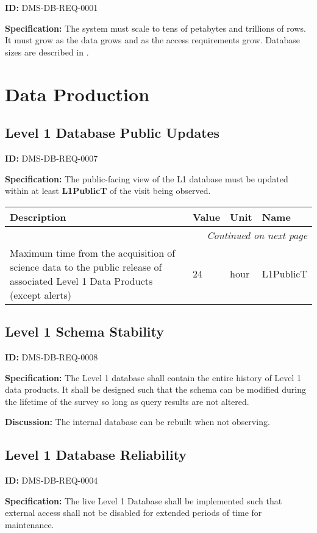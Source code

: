 \documentclass[SE,toc,lsstdraft]{lsstdoc}
\makeatletter
\newcommand{\paramname}[1]{\hspace{0pt}#1}
\newcommand{\unitname}[1]{\hspace{0pt}#1}
\newenvironment{parameters}[0]{%
\setlength\LTleft{0pt}
\setlength\LTright{\fill}
\begin{small}
\begin{longtable}[]{|p{0.49\textwidth}|l|p{0.6in}|p{1.70in}@{}|}

\hline \textbf{Description} & \textbf{Value} & \textbf{Unit} & \textbf{Name} \\ \hline
\endhead

\hline \multicolumn{4}{r}{\emph{Continued on next page}} \\
\endfoot

\hline\hline
\endlastfoot
}{%
\hline
\end{longtable}
\end{small}
}
\makeatother
\begin{document}
\label{DMS-DB-REQ-0001}
\textbf{ID:} DMS-DB-REQ-0001

\textbf{Specification:}
The system must scale to tens of petabytes and trillions of rows. It must grow as the data grows and as the access requirements grow. Database sizes are described in .

\section{Data Production}

\subsection{Level 1 Database Public Updates}

\label{DMS-DB-REQ-0007}
\textbf{ID:} DMS-DB-REQ-0007

\textbf{Specification:}
The public-facing view of the L1 database must be updated within at least \textbf{L1PublicT} of the visit being observed.

\begin{parameters}
Maximum time from the acquisition of science data to the public release of associated Level 1 Data Products (except alerts)
&
24
&
\unitname{%
hour
}
&
\paramname{%
L1PublicT
} \\\hline
\end{parameters}

\subsection{Level 1 Schema Stability}

\label{DMS-DB-REQ-0008}
\textbf{ID:} DMS-DB-REQ-0008

\textbf{Specification:}
The Level 1 database shall contain the entire history of Level 1 data products. It shall be designed such that the schema can be modified during the lifetime of the survey so long as query results are not altered.

\textbf{Discussion:}
The internal database can be rebuilt when not observing.

\subsection{Level 1 Database Reliability}

\label{DMS-DB-REQ-0004}
\textbf{ID:} DMS-DB-REQ-0004

\textbf{Specification:}
The live Level 1 Database shall be implemented such that external access shall not be disabled for extended periods of time for maintenance.
\end{document}

